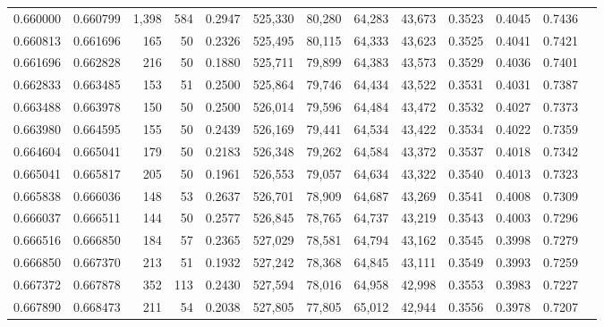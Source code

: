 \begin{tabular}{rrrrrrrrrrrrr}
0.660000 & 0.660799 & 1,398 & 584 &                                     0.2947 & 525,330 &  80,280 &  64,283 &  43,673 & 0.3523 & 0.4045 & 0.7436 \\
0.660813 & 0.661696 &   165 &  50 &                                     0.2326 & 525,495 &  80,115 &  64,333 &  43,623 & 0.3525 & 0.4041 & 0.7421 \\
0.661696 & 0.662828 &   216 &  50 &                                     0.1880 & 525,711 &  79,899 &  64,383 &  43,573 & 0.3529 & 0.4036 & 0.7401 \\
0.662833 & 0.663485 &   153 &  51 &                                     0.2500 & 525,864 &  79,746 &  64,434 &  43,522 & 0.3531 & 0.4031 & 0.7387 \\
0.663488 & 0.663978 &   150 &  50 &                                     0.2500 & 526,014 &  79,596 &  64,484 &  43,472 & 0.3532 & 0.4027 & 0.7373 \\
0.663980 & 0.664595 &   155 &  50 &                                     0.2439 & 526,169 &  79,441 &  64,534 &  43,422 & 0.3534 & 0.4022 & 0.7359 \\
0.664604 & 0.665041 &   179 &  50 &                                     0.2183 & 526,348 &  79,262 &  64,584 &  43,372 & 0.3537 & 0.4018 & 0.7342 \\
0.665041 & 0.665817 &   205 &  50 &                                     0.1961 & 526,553 &  79,057 &  64,634 &  43,322 & 0.3540 & 0.4013 & 0.7323 \\
0.665838 & 0.666036 &   148 &  53 &                                     0.2637 & 526,701 &  78,909 &  64,687 &  43,269 & 0.3541 & 0.4008 & 0.7309 \\
0.666037 & 0.666511 &   144 &  50 &                                     0.2577 & 526,845 &  78,765 &  64,737 &  43,219 & 0.3543 & 0.4003 & 0.7296 \\
0.666516 & 0.666850 &   184 &  57 &                                     0.2365 & 527,029 &  78,581 &  64,794 &  43,162 & 0.3545 & 0.3998 & 0.7279 \\
0.666850 & 0.667370 &   213 &  51 &                                     0.1932 & 527,242 &  78,368 &  64,845 &  43,111 & 0.3549 & 0.3993 & 0.7259 \\
0.667372 & 0.667878 &   352 & 113 &                                     0.2430 & 527,594 &  78,016 &  64,958 &  42,998 & 0.3553 & 0.3983 & 0.7227 \\
0.667890 & 0.668473 &   211 &  54 &                                     0.2038 & 527,805 &  77,805 &  65,012 &  42,944 & 0.3556 & 0.3978 & 0.7207 \\

\end{tabular}
